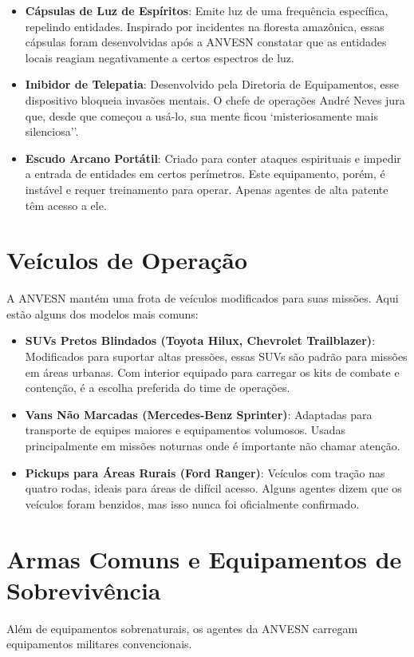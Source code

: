 \documentclass{book}
\begin{document}
\begin{itemize}
    \item \textbf{Cápsulas de Luz de Espíritos}: Emite luz de uma frequência específica, repelindo entidades. Inspirado por incidentes na floresta amazônica, essas cápsulas foram desenvolvidas após a ANVESN constatar que as entidades locais reagiam negativamente a certos espectros de luz.

    \item \textbf{Inibidor de Telepatia}: Desenvolvido pela Diretoria de Equipamentos, esse dispositivo bloqueia invasões mentais. O chefe de operações André Neves jura que, desde que começou a usá-lo, sua mente ficou `misteriosamente mais silenciosa''.

    \item \textbf{Escudo Arcano Portátil}: Criado para conter ataques espirituais e impedir a entrada de entidades em certos perímetros. Este equipamento, porém, é instável e requer treinamento para operar. Apenas agentes de alta patente têm acesso a ele.
\end{itemize}

\section{Veículos de Operação}
A ANVESN mantém uma frota de veículos modificados para suas missões. Aqui estão alguns dos modelos mais comuns:

\begin{itemize}
    \item \textbf{SUVs Pretos Blindados (Toyota Hilux, Chevrolet Trailblazer)}: Modificados para suportar altas pressões, essas SUVs são padrão para missões em áreas urbanas. Com interior equipado para carregar os kits de combate e contenção, é a escolha preferida do time de operações.

    \item \textbf{Vans Não Marcadas (Mercedes-Benz Sprinter)}: Adaptadas para transporte de equipes maiores e equipamentos volumosos. Usadas principalmente em missões noturnas onde é importante não chamar atenção.

    \item \textbf{Pickups para Áreas Rurais (Ford Ranger)}: Veículos com tração nas quatro rodas, ideais para áreas de difícil acesso. Alguns agentes dizem que os veículos foram benzidos, mas isso nunca foi oficialmente confirmado.
\end{itemize}

\section{Armas Comuns e Equipamentos de Sobrevivência}
Além de equipamentos sobrenaturais, os agentes da ANVESN carregam equipamentos militares convencionais.
\end{document}
